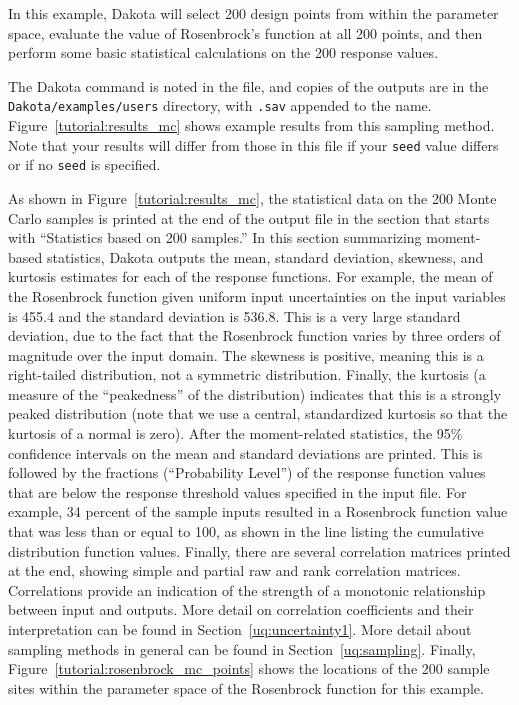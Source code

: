 In this example, Dakota will select 200 design points from within the
parameter space, evaluate the value of Rosenbrock's function at all
200 points, and then perform some basic statistical calculations on
the 200 response values.

The Dakota command is noted in the file, and copies of the outputs
are in the \texttt{Dakota/examples/users} directory, with \texttt{.sav} 
appended to the name.  
Figure~\ref{tutorial:results_mc} shows example results from this 
sampling method. 
Note that your results will differ from those in
this file if your \texttt{seed} value differs or if no \texttt{seed}
is specified.

As shown in Figure~\ref{tutorial:results_mc}, 
the statistical data on the 200 Monte Carlo samples is printed at the
end of the output file in the section that starts with ``Statistics
based on 200 samples.'' In this section summarizing 
moment-based statistics, Dakota outputs the
mean, standard deviation, skewness, and kurtosis estimates 
for each of the response functions. For example, 
the mean of the Rosenbrock function given uniform input uncertainties 
on the input variables is 455.4 and the standard deviation is 536.8. 
This is a very large standard deviation, due to the fact that the 
Rosenbrock function varies by three orders of magnitude over the input 
domain. The skewness is positive, meaning this is a right-tailed distribution, 
not a symmetric distribution. Finally, the kurtosis (a measure of the 
``peakedness'' of the distribution) indicates that 
this is a strongly peaked distribution (note that we use a central, 
standardized kurtosis so that the kurtosis of a normal is zero). 
After the moment-related statistics, the 95\% confidence intervals on the 
mean and standard deviations are printed. This is followed by
the fractions (``Probability Level'') of the response function values 
that are below the response threshold values specified in the input file. 
For example, 34 percent of the sample inputs resulted in a Rosenbrock 
function value that was less than or equal to 100, as shown in the line 
listing the cumulative distribution function values. 
Finally, there are several 
correlation matrices printed at the end, showing simple and partial 
raw and rank correlation matrices. Correlations provide an indication 
of the strength of a monotonic relationship between input and outputs. 
More detail on correlation coefficients and their interpretation can be 
found in Section~\ref{uq:uncertainty1}. 
More detail about sampling methods in general can be found in 
Section~\ref{uq:sampling}. Finally,  
Figure~\ref{tutorial:rosenbrock_mc_points} shows the locations
of the 200 sample sites within the parameter space of the Rosenbrock
function for this example.

